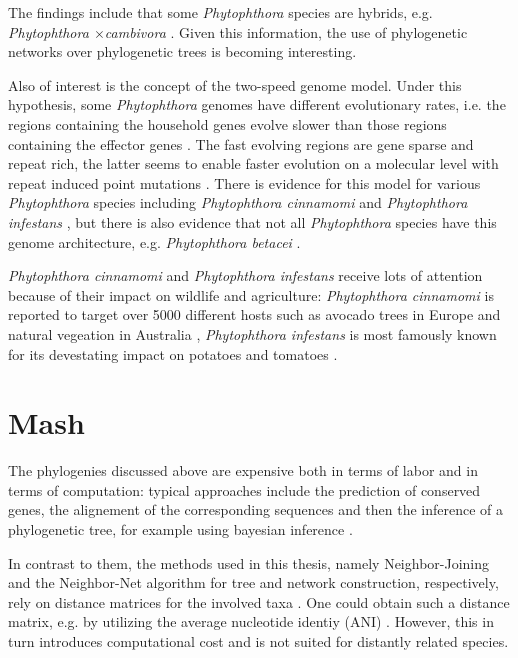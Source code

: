 The findings include that some \textit{Phytophthora} species are
hybrids, e.g. \textit{Phytophthora $\times$cambivora}
\cite{jungSixNewPhytophthora2017,vanpouckeUnravellingHybridizationPhytophthora2021}.
Given this information, the use of phylogenetic networks over phylogenetic trees
is becoming interesting. 

Also of interest is the concept of the two-speed genome model. Under this
hypothesis, some \textit{Phytophthora} genomes have different evolutionary
rates, i.e. the regions containing the household genes evolve slower than those
regions containing the effector genes \cite{dongTwospeedGenomesFilamentous2015}.
The fast evolving regions are gene sparse and repeat rich, the latter seems to
enable faster evolution on a molecular level with repeat induced point mutations
\cite{dongTwospeedGenomesFilamentous2015}. There is evidence for this model for
various \textit{Phytophthora} species including \textit{Phytophthora cinnamomi}
\cite{engelbrechtGenomeDestructiveOomycete2021} and \textit{Phytophthora
infestans} \cite{ayala-usmaWholeGenomeDuplication2021,dongTwospeedGenomesFilamentous2015},
but there is also evidence that not all \textit{Phytophthora} species have this
genome architecture, e.g. \textit{Phytophthora betacei}
\cite{ayala-usmaWholeGenomeDuplication2021}.

\textit{Phytophthora cinnamomi} and \textit{Phytophthora infestans} receive lots
of attention because of their impact on wildlife and agriculture:
\textit{Phytophthora cinnamomi} is reported to target over 5000 different hosts
such as avocado trees in Europe and natural vegeation in Australia
\cite{hardhamPhytophthoraCinnamomi2018,solis-garciaPhytophthoraRootRot2020},
\textit{Phytophthora infestans} is most famously known for its devestating
impact on potatoes and tomatoes \cite{ayala-usmaWholeGenomeDuplication2021}.


\section{Mash}
The phylogenies discussed above are expensive both in terms of labor and in
terms of computation: typical approaches include the prediction of conserved
genes, the alignement of the corresponding sequences and then the inference of a
phylogenetic tree, for example using bayesian inference
\cite{abadPhytophthoraTaxonomicPhylogenetic2023a,winkworthComparativeAnalysesComplete2022}.

In contrast to them, the methods used in this thesis, namely Neighbor-Joining
and the Neighbor-Net algorithm for tree and network construction, respectively,
rely on distance matrices for the involved taxa
\cite{saitouNeighborjoiningMethodNew1987,bryantNeighborNetImprovedAlgorithms2023,bryantNeighborNetAgglomerativeMethod2004}.
One could obtain such a distance matrix, e.g. by utilizing the average
nucleotide identiy (ANI) \cite{leeOrthoANIImprovedAlgorithm2016}. However, this
in turn introduces computational cost and is not suited for distantly related
species.

